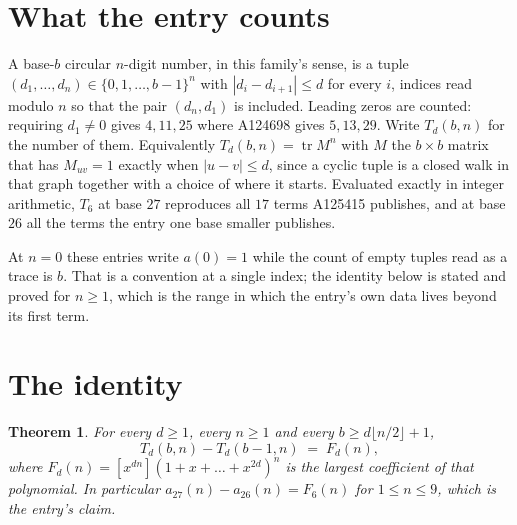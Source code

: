 \documentclass[11pt,a4paper]{article}
\theoremstyle{plain}
\newtheorem{theorem}{Theorem}
\theoremstyle{definition}
\begin{document}
\section{What the entry counts}

A base-$b$ circular $n$-digit number, in this family's sense, is a tuple
$(d_1,\dots,d_n)\in\{0,1,\dots,b-1\}^{n}$ with $|d_i-d_{i+1}|\le d$ for every $i$, indices
read modulo $n$ so that the pair $(d_n,d_1)$ is included. Leading zeros are counted: requiring
$d_1\ne0$ gives $4,11,25$ where A124698 gives $5,13,29$. Write $T_d(b,n)$ for the number of
them. Equivalently $T_d(b,n)=\operatorname{tr}M^{n}$ with $M$ the $b\times b$ matrix that has
$M_{uv}=1$ exactly when $|u-v|\le d$, since a cyclic tuple is a closed walk in that graph
together with a choice of where it starts. Evaluated exactly in integer arithmetic, $T_{6}$
at base $27$ reproduces all $17$ terms A125415 publishes, and at base $26$ all the
terms the entry one base smaller publishes.

At $n=0$ these entries write $a(0)=1$ while the count of empty tuples read as a trace is $b$.
That is a convention at a single index; the identity below is stated and proved for $n\ge1$,
which is the range in which the entry's own data lives beyond its first term.

\section{The identity}

\begin{theorem}
For every $d\ge1$, every $n\ge1$ and every $b\ge d\lfloor n/2\rfloor+1$,
\[
T_d(b,n)-T_d(b-1,n)\;=\;F_d(n),
\]
where $F_d(n)=[x^{dn}](1+x+\dots+x^{2d})^{n}$ is the largest coefficient of that
polynomial. In particular $a_{27}(n)-a_{26}(n)=F_{6}(n)$ for $1\le n\le9$, which
is the entry's claim.
\end{theorem}
\end{document}
